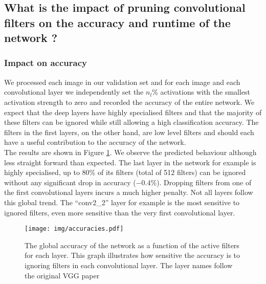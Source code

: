 \documentclass{article}
\begin{document}
\subsection{What is the impact of pruning convolutional filters on the accuracy and runtime of the network ?}
\subsubsection{Impact on accuracy}
We processed each image in our validation set and for each image and each convolutional layer we independently set the $n_l\%$ activations with the smallest activation strength to zero and recorded the accuracy of the entire network. We expect that the deep layers have highly specialised filters and that the majority of these filters can be ignored while still allowing a high classification accuracy. The filters in the first layers, on the other hand, are low level filters and should each have a useful contribution to the accuracy of the network.
\\
\newline
The results are shown in Figure \ref{fig:accuracyperfilter}. We observe the predicted behaviour although less straight forward than expected. The last layer in the network for example is highly specialised, up to 80\% of its filters (total of 512 filters) can be ignored without any significant drop in accuracy ($-0.4\%$). Dropping filters from one of the first convolutional layers incurs a much higher penalty. Not all layers follow this global trend. The ``conv2\_2'' layer for example is the most sensitive to ignored filters, even more sensitive than the very first convolutional layer. 

\begin{figure}[t]
\begin{center}
\centerline{
\texttt{[image: img/accuracies.pdf]}
}
\caption{The global accuracy of the network as a function of the active filters for each layer. This graph illustrates how sensitive the accuracy is to ignoring filters in each convolutional layer. The layer names follow the original VGG paper \cite{simonyan2014very}}
\label{fig:accuracyperfilter}
\end{center}
\end{figure}
\end{document}
